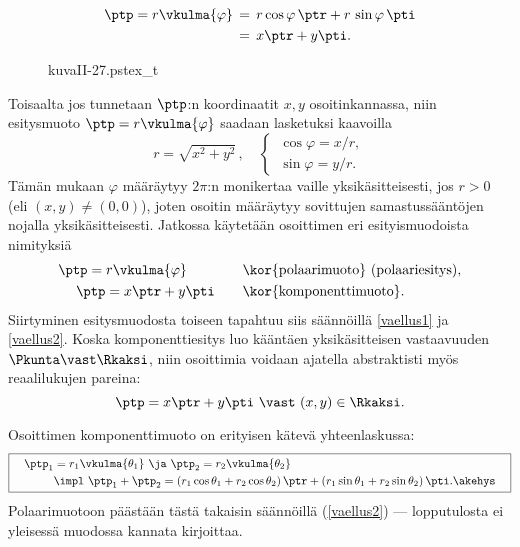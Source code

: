 \begin{align} \label{vaellus1}
\ptp = r \vkulma{\varphi}\, &=\, r\cos{\varphi}\,\ptr + r\, \sin{\varphi}\,\pti \notag \\ 
                            &=\, x \ptr + y \pti.
\end{align}
\begin{figure}[H]
\begin{center}
{kuvaII-27.pstex_t}
\end{center}
\end{figure}
Toisaalta jos tunnetaan $\ptp$:n koordinaatit $x,y$ osoitinkannassa, niin esitysmuoto 
$\ptp = r \vkulma{\varphi}$ saadaan lasketuksi kaavoilla
\begin{equation} \label{vaellus2}
r=\sqrt{x^2+y^2}\,, \quad \begin{cases}
                          \,\cos{\varphi} = x/r, \\ \,\sin{\varphi} = y/r.
                          \end{cases}
\end{equation}
Tämän mukaan $\varphi$ määräytyy $2\pi$:n monikertaa vaille yksikäsitteisesti, jos $r>0$
(eli $(x,y)\neq(0,0)$), joten osoitin määräytyy sovittujen samastussääntöjen nojalla
yksikäsitteisesti. Jatkossa käytetään osoittimen eri esityismuodoista nimityksiä
\begin{align*}
\ptp = r \vkulma{\varphi} \qquad\qquad &\text{\kor{polaarimuoto} (polaariesitys)}, \\
\ptp = x \ptr + y \pti    \qquad       &\text{\kor{komponenttimuoto}}.
\end{align*} 
Siirtyminen esitysmuodosta toiseen tapahtuu siis säännöillä \eqref{vaellus1} ja
\eqref{vaellus2}. Koska komponenttiesitys luo kääntäen yksikäsitteisen vastaavuuden
$\Pkunta \vast \Rkaksi$, niin osoittimia voidaan ajatella abstraktisti myös reaalilukujen
pareina:
\[
\ptp = x\ptr+y\pti\ \vast\ (x,y)\in\Rkaksi.
\]

Osoittimen komponenttimuoto on erityisen kätevä yhteenlaskussa:
\[
\boxed{\begin{aligned}
\quad \ptp_1 &= r_1 \vkulma{\theta_1} \ \ja \ \ptp_2 = r_2 \vkulma{\theta_2} \\
             &\impl\ \ptp_1 + \ptp_2 = (r_1 \cos{\theta_1} + r_2 \cos{\theta_2})\,\ptr 
                                     + (r_1 \sin{\theta_1} + r_2 \sin{\theta_2})\,\pti.
                                                                            \akehys\quad
\end{aligned} } \]
Polaarimuotoon päästään tästä takaisin säännöillä (\ref{vaellus2}) --- lopputulosta ei
yleisessä muodossa kannata kirjoittaa.

